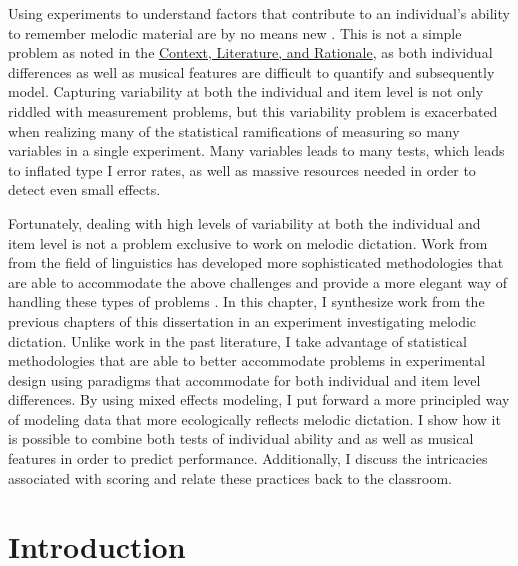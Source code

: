 \documentclass[12pt,]{book}
\begin{document}
Using experiments to understand factors that contribute to an individual's ability to remember melodic material are by no means new \citep{ortmannTonalDeterminantsMelodic1933}.
This is not a simple problem as noted in the \protect\hyperlink{intro}{Context, Literature, and Rationale}, as both individual differences as well as musical features are difficult to quantify and subsequently model.
Capturing variability at both the individual and item level is not only riddled with measurement problems, but this variability problem is exacerbated when realizing many of the statistical ramifications of measuring so many variables in a single experiment.
Many variables leads to many tests, which leads to inflated type I error rates, as well as massive resources needed in order to detect even small effects.

Fortunately, dealing with high levels of variability at both the individual and item level is not a problem exclusive to work on melodic dictation.
Work from from the field of linguistics has developed more sophisticated methodologies that are able to accommodate the above challenges and provide a more elegant way of handling these types of problems \citep{baayenMixedeffectsModelingCrossed2008}.
In this chapter, I synthesize work from the previous chapters of this dissertation in an experiment investigating melodic dictation.
Unlike work in the past literature, I take advantage of statistical methodologies that are able to better accommodate problems in experimental design using paradigms that accommodate for both individual and item level differences.
By using mixed effects modeling, I put forward a more principled way of modeling data that more ecologically reflects melodic dictation.
I show how it is possible to combine both tests of individual ability and as well as musical features in order to predict performance.
Additionally, I discuss the intricacies associated with scoring and relate these practices back to the classroom.

\hypertarget{introduction}{%
\section{Introduction}\label{introduction}}
\end{document}
